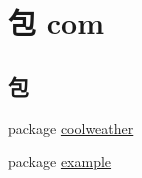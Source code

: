 \hypertarget{namespacecom}{}\section{包 com}
\label{namespacecom}
\subsection*{包}
\begin{DoxyCompactItemize}
\item 
package \mbox{\hyperlink{namespacecom_1_1coolweather}{coolweather}}
\item 
package \mbox{\hyperlink{namespacecom_1_1example}{example}}
\end{DoxyCompactItemize}
